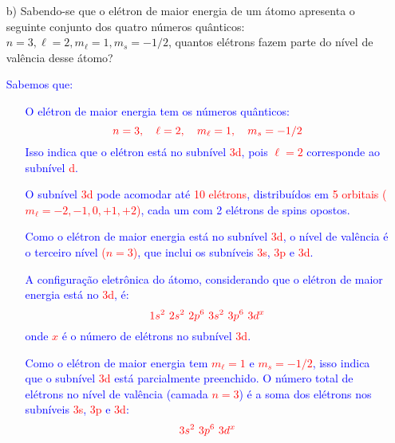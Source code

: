 \documentclass[a4paper, 12pt]{article}
\begin{document}
\begin{enumerate}
\begin{enumerate}
              \item[b)] Sabendo-se que o elétron de maior energia de um átomo apresenta o seguinte conjunto dos quatro números quânticos: \( n = 3, \ell = 2, m_\ell = 1, m_s = -1/2 \), quantos elétrons fazem parte do nível de valência desse átomo?
                    \\[2mm]
                    \textcolor{blue}{
                        Sabemos que:
                        \begin{itemize}
                            \item[] O elétron de maior energia tem os números quânticos:
                                  \[
                                      \textcolor{red}{n = 3, \quad \ell = 2, \quad m_\ell = 1, \quad m_s = -1/2}
                                  \]
                                  Isso indica que o elétron está no subnível \textcolor{red}{3d}, pois \textcolor{red}{\(\ell = 2\)} corresponde ao subnível \textcolor{red}{d}.
                            \item[] O subnível \textcolor{red}{3d} pode acomodar até \textcolor{red}{10 elétrons}, distribuídos em \textcolor{red}{5 orbitais} \textcolor{red}{(\( m_\ell = -2, -1, 0, +1, +2 \))}, cada um com 2 elétrons de spins opostos.
                            \item[] Como o elétron de maior energia está no subnível \textcolor{red}{3d}, o nível de valência é o terceiro nível \textcolor{red}{(\( n = 3 \))}, que inclui os subníveis \textcolor{red}{3s}, \textcolor{red}{3p} e \textcolor{red}{3d}.
                            \item[] A configuração eletrônica do átomo, considerando que o elétron de maior energia está no \textcolor{red}{3d}, é:
                                  \[
                                      \textcolor{red}{1s^2 \ 2s^2 \ 2p^6 \ 3s^2 \ 3p^6 \ 3d^x}
                                  \]
                                  onde \textcolor{red}{\(x\)} é o número de elétrons no subnível \textcolor{red}{3d}.
                            \item[] Como o elétron de maior energia tem \textcolor{red}{\( m_\ell = 1 \)} e \textcolor{red}{\( m_s = -1/2 \)}, isso indica que o subnível \textcolor{red}{3d} está parcialmente preenchido. O número total de elétrons no nível de valência (camada \textcolor{red}{\( n = 3 \)}) é a soma dos elétrons nos subníveis \textcolor{red}{3s}, \textcolor{red}{3p} e \textcolor{red}{3d}:
                                  \[
                                      \textcolor{red}{3s^2 \ 3p^6 \ 3d^x}
\]
\end{itemize}}
\end{enumerate}
\end{enumerate}
\end{document}
